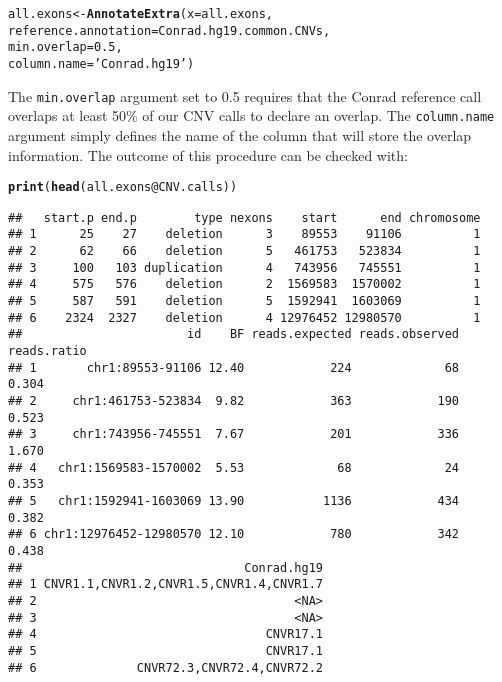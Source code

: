 \documentclass[10pt]{article}\usepackage[]{graphicx}\usepackage[]{color}
\makeatletter
\newcommand{\hlnum}[1]{\textcolor[rgb]{0.686,0.059,0.569}{#1}}%
\newcommand{\hlstr}[1]{\textcolor[rgb]{0.192,0.494,0.8}{#1}}%
\newcommand{\hlopt}[1]{\textcolor[rgb]{0,0,0}{#1}}%
\newcommand{\hlstd}[1]{\textcolor[rgb]{0.345,0.345,0.345}{#1}}%
\newcommand{\hlkwb}[1]{\textcolor[rgb]{0.69,0.353,0.396}{#1}}%
\newcommand{\hlkwc}[1]{\textcolor[rgb]{0.333,0.667,0.333}{#1}}%
\newcommand{\hlkwd}[1]{\textcolor[rgb]{0.737,0.353,0.396}{\textbf{#1}}}%
\newenvironment{kframe}{%
 \def\at@end@of@kframe{}%
 \ifinner\ifhmode%
  \def\at@end@of@kframe{\end{minipage}}%
  \begin{minipage}{\columnwidth}%
 \fi\fi%
 \def\FrameCommand##1{\hskip\@totalleftmargin \hskip-\fboxsep
 \colorbox{shadecolor}{##1}\hskip-\fboxsep
     \hskip-\linewidth \hskip-\@totalleftmargin \hskip\columnwidth}%
 \MakeFramed {\advance\hsize-\width
   \@totalleftmargin\z@ \linewidth\hsize
   \@setminipage}}%
 {\par\unskip\endMakeFramed%
 \at@end@of@kframe}
\newenvironment{knitrout}{}{} %
\makeatother
\begin{document}
\begin{knitrout}
\color{fgcolor}\begin{kframe}
\begin{alltt}
\hlstd{all.exons} \hlkwb{<-} \hlkwd{AnnotateExtra}\hlstd{(}\hlkwc{x} \hlstd{= all.exons,}
                           \hlkwc{reference.annotation} \hlstd{= Conrad.hg19.common.CNVs,}
                           \hlkwc{min.overlap} \hlstd{=} \hlnum{0.5}\hlstd{,}
                           \hlkwc{column.name} \hlstd{=} \hlstr{'Conrad.hg19'}\hlstd{)}
\end{alltt}
\end{kframe}
\end{knitrout}


The \texttt{min.overlap} argument set to 0.5 requires that the Conrad reference call overlaps at least 50\% of our CNV calls to declare an overlap.
The \texttt{column.name} argument simply defines the name of the column that will store the overlap information.
The outcome of this procedure can be checked with:

\begin{knitrout}
\color{fgcolor}\begin{kframe}
\begin{alltt}
\hlkwd{print}\hlstd{(}\hlkwd{head}\hlstd{(all.exons}\hlopt{@}\hlkwc{CNV.calls}\hlstd{))}
\end{alltt}
\begin{verbatim}
##   start.p end.p        type nexons    start      end chromosome
## 1      25    27    deletion      3    89553    91106          1
## 2      62    66    deletion      5   461753   523834          1
## 3     100   103 duplication      4   743956   745551          1
## 4     575   576    deletion      2  1569583  1570002          1
## 5     587   591    deletion      5  1592941  1603069          1
## 6    2324  2327    deletion      4 12976452 12980570          1
##                       id    BF reads.expected reads.observed reads.ratio
## 1       chr1:89553-91106 12.40            224             68       0.304
## 2     chr1:461753-523834  9.82            363            190       0.523
## 3     chr1:743956-745551  7.67            201            336       1.670
## 4   chr1:1569583-1570002  5.53             68             24       0.353
## 5   chr1:1592941-1603069 13.90           1136            434       0.382
## 6 chr1:12976452-12980570 12.10            780            342       0.438
##                               Conrad.hg19
## 1 CNVR1.1,CNVR1.2,CNVR1.5,CNVR1.4,CNVR1.7
## 2                                    <NA>
## 3                                    <NA>
## 4                                CNVR17.1
## 5                                CNVR17.1
## 6              CNVR72.3,CNVR72.4,CNVR72.2
\end{verbatim}
\end{kframe}
\end{knitrout}
\end{document}

